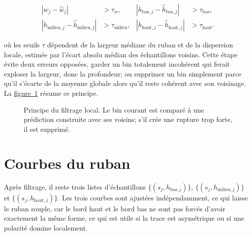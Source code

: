 \documentclass[a4paper,11pt]{report}
\newcommand{\figref}[1]{\hyperref[#1]{figure~\ref*{#1}}}
\begin{document}
\begin{equation}
\begin{aligned}
|w_j - \hat{w}_j| &> \tau_w,
& |h_{\text{bas},j}-\hat{h}_{\text{bas},j}| &> \tau_{\text{bas}}, \\
|h_{\text{milieu},j}-\hat{h}_{\text{milieu},j}| &> \tau_{\text{milieu}},
& |h_{\text{haut},j}-\hat{h}_{\text{haut},j}| &> \tau_{\text{haut}}.
\end{aligned}
\label{eq:filtrage-local}
\end{equation}

où les seuils \(\tau\) dépendent de la largeur médiane du ruban et de la dispersion locale, estimée par l'écart absolu médian des échantillons voisins. Cette étape évite deux erreurs opposées, garder un bin totalement incohérent qui ferait exploser la largeur, donc la profondeur; ou supprimer un bin simplement parce qu'il s'écarte de la moyenne globale alors qu'il reste cohérent avec son voisinage. La \figref{fig:trace-local-neighbour-filter} résume ce principe.

\begin{figure}[H]
  \centering
  \caption{Principe du filtrage local. Le bin courant est comparé à une prédiction construite avec ses voisins; s'il crée une rupture trop forte, il est supprimé.}
  \label{fig:trace-local-neighbour-filter}
\end{figure}

\section*{Courbes du ruban}

Après filtrage, il reste trois listes d'échantillons \(\{(s_j,h_{\text{bas},j})\}\), \(\{(s_j,h_{\text{milieu},j})\}\) et \(\{(s_j,h_{\text{haut},j})\}\). Les trois courbes sont ajustées indépendamment, ce qui laisse le ruban souple, car le bord haut et le bord bas ne sont pas forcés d'avoir exactement la même forme, ce qui est utile si la trace est asymétrique ou si une polarité domine localement.
\end{document}
